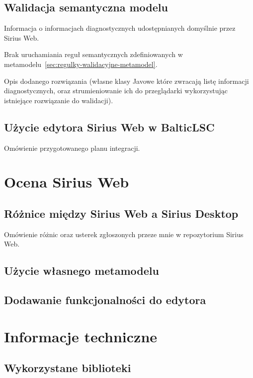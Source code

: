 \section{Walidacja semantyczna modelu}

Informacja o informacjach diagnostycznych udostępnianych domyślnie przez Sirius
Web.

Brak uruchamiania reguł semantycznych zdefiniowanych w
metamodelu~\ref{sec:regulky-walidacyjne-metamodel}.

Opis dodanego rozwiązania (własne klasy Javowe które zwracają listę informacji
diagnostycznych, oraz strumieniowanie ich do przeglądarki wykorzystując
istniejące rozwiązanie do walidacji).

\section{Użycie edytora Sirius Web w BalticLSC}

Omówienie przygotowanego planu integracji.

\chapter{Ocena Sirius Web}

\section{Różnice między Sirius Web a Sirius Desktop}

Omówienie różnic oraz usterek zgłoszonych przeze mnie w repozytorium Sirius
Web.

\section{Użycie własnego metamodelu}

\section{Dodawanie funkcjonalności do edytora}

\chapter{Informacje techniczne}

\section{Wykorzystane biblioteki}

